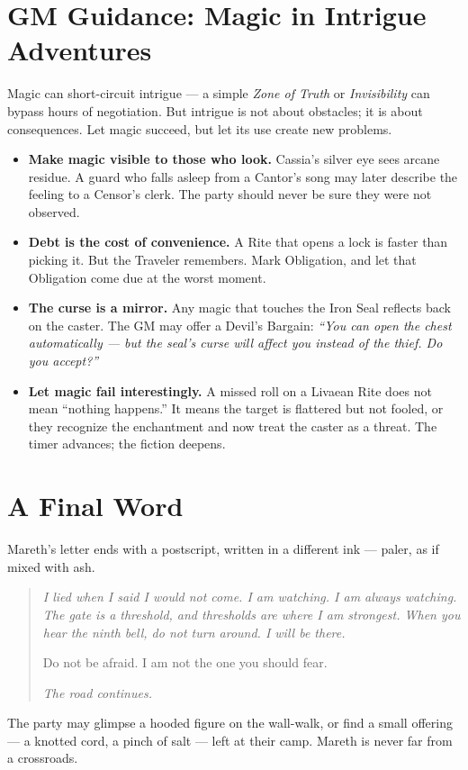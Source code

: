 \documentclass[10pt,twoside]{book}
\begin{document}
\section*{GM Guidance: Magic in Intrigue Adventures}

Magic can short-circuit intrigue --- a simple \textit{Zone of Truth} or \textit{Invisibility} can bypass hours of negotiation. But intrigue is not about obstacles; it is about consequences. Let magic succeed, but let its use create new problems.

\begin{itemize}
\item \textbf{Make magic visible to those who look.} Cassia's silver eye sees arcane residue. A guard who falls asleep from a Cantor's song may later describe the feeling to a Censor's clerk. The party should never be sure they were not observed.
\item \textbf{Debt is the cost of convenience.} A Rite that opens a lock is faster than picking it. But the Traveler remembers. Mark Obligation, and let that Obligation come due at the worst moment.
\item \textbf{The curse is a mirror.} Any magic that touches the Iron Seal reflects back on the caster. The GM may offer a Devil's Bargain: \textit{``You can open the chest automatically --- but the seal's curse will affect you instead of the thief. Do you accept?''}
\item \textbf{Let magic fail interestingly.} A missed roll on a Livaean Rite does not mean ``nothing happens.'' It means the target is flattered but not fooled, or they recognize the enchantment and now treat the caster as a threat. The timer advances; the fiction deepens.
\end{itemize}

\section*{A Final Word}

Mareth's letter ends with a postscript, written in a different ink --- paler, as if mixed with ash.

\begin{quote}\itshape
I lied when I said I would not come. I am watching. I am always watching. The gate is a threshold, and thresholds are where I am strongest. When you hear the ninth bell, do not turn around. I will be there.

Do not be afraid. I am not the one you should fear.

\textit{The road continues.}
\end{quote}

The party may glimpse a hooded figure on the wall-walk, or find a small offering --- a knotted cord, a pinch of salt --- left at their camp. Mareth is never far from a crossroads.
\end{document}
